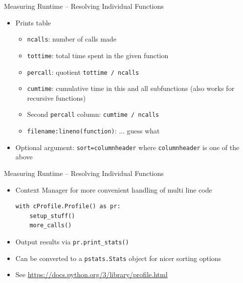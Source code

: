 
\begin{frame}{Measuring Runtime -- Resolving Individual Functions}
%
\begin{itemize}
\item Prints table
	\begin{itemize}
	\item \texttt{ncalls}: number of calls made
	\item \texttt{tottime}: total time spent in the given function
	\item \texttt{percall}: quotient \texttt{tottime / ncalls}
	\item \texttt{cumtime}: cumulative time in this and all subfunctions (also works for recursive functions)
	\item Second \texttt{percall} column: \texttt{cumtime / ncalls}
	\item \texttt{filename:lineno(function)}: ... guess what
	\end{itemize}
\item Optional argument: \texttt{sort=columnheader} where \texttt{columnheader} is one of the above
\end{itemize}
%
\end{frame}


\begin{frame}[fragile]{Measuring Runtime -- Resolving Individual Functions}
%
\begin{itemize}
\item Context Manager for more convenient handling of multi line code
\begin{verbatim}
with cProfile.Profile() as pr:
    setup_stuff()
    more_calls()
\end{verbatim}
\item Output results via \texttt{pr.print\_stats()}
\item Can be converted to a \texttt{pstats.Stats} object for nicer sorting options
\item See \url{https://docs.python.org/3/library/profile.html}
\end{itemize}
%
\end{frame}


